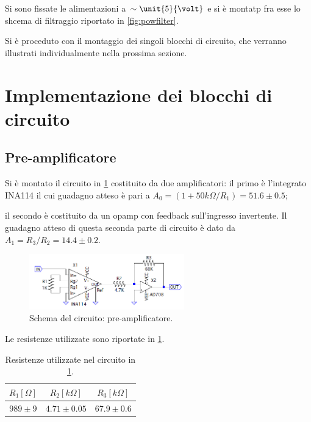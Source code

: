 \documentclass[a4paper,10pt]{article}
\begin{document}
Si sono fissate le alimentazioni a $\sim \unit{5}{\volt}$ e si è montatp fra esse lo shcema di filtraggio riportato in  \cref{fig:powfilter}.

Si è proceduto con il montaggio dei singoli blocchi di circuito, che verranno illustrati individualmente nella prossima sezione.


\section{Implementazione dei blocchi di circuito}

\subsection{Pre-amplificatore}

Si è montato il circuito in \cref{fig:preamp} costituito da due amplificatori: il primo è l'integrato INA114 il cui guadagno atteso è pari a $A_0 = (1+ 50k\Omega/R_1) = 51.6 \pm 0.5$; %



il secondo è costituito da un opamp con feedback sull'ingresso invertente. Il guadagno atteso di questa seconda parte di circuito è dato da $A_1 = R_3/R_2 = 14.4 \pm 0.2 $.

\begin{figure}
	\vspace{-10pt}
	\centering
	\includegraphics[width=0.6\textwidth]{../grafici/PreAmp.png}
	\vspace{-12pt}
	\caption{Schema del circuito: pre-amplificatore.}
	\label{fig:preamp}
	\vspace{-6pt}
\end{figure}


Le resistenze utilizzate sono riportate in \cref{tab:resistenze}.

\begin{table}[H]
	\centering
	\begin{tabular}{ccc}
		\hline
		$R_1[\Omega]$ & $R_2[k\Omega]$ & $R_3[k\Omega]$\\
		\hline
		$989\pm9$ & $4.71\pm0.05$ & $67.9\pm0.6$\\
		\hline
	\end{tabular}
	\caption{Resistenze utilizzate nel circuito in \cref{fig:preamp}.}
	\label{tab:resistenze}
\end{table}
\end{document}
